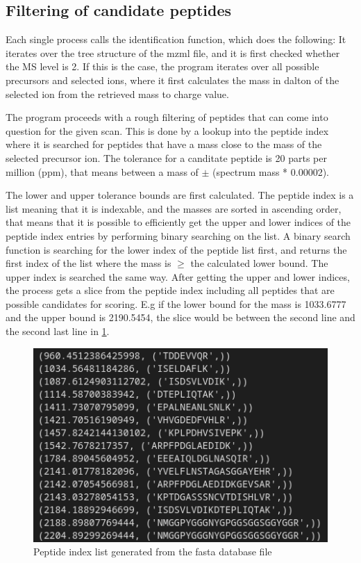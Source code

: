 \documentclass[11pt]{article}
\begin{document}
\subsection{Filtering of candidate peptides}
Each single process calls the identification function, which does the following:
It iterates over the tree structure of the mzml file, and it is first checked whether the MS level is 2. If this is the case, the program iterates over all possible precursors and selected ions, where it first calculates the mass in dalton of the selected ion from the retrieved mass to charge value. 

The program proceeds with a rough filtering of peptides that can come into question for the given scan. This is done by a lookup into the peptide index where it is searched for peptides that have a mass close to the mass of the selected precursor ion. The tolerance for a canditate peptide is 20 parts per million (ppm), that means between a mass of $\pm$ (spectrum mass * 0.00002).

The lower and upper tolerance bounds are first calculated. The peptide index is a list meaning that it is indexable, and the masses are sorted in ascending order, that means that it is possible to efficiently get the upper and lower indices of the peptide index entries by performing binary searching on the list. A binary search function is searching for the lower index of the peptide list first, and returns the first index of the list where the mass is $\ge$ the calculated lower bound. The upper index is searched the same way. After getting the upper and lower indices, the process gets a slice from the peptide index including all peptides that are possible candidates for scoring. E.g if the lower bound for the mass is 1033.6777 and the upper bound is 2190.5454, the slice would be between the second line and the second last line in \cref{fig:peptindex}.
\begin{figure}
\includegraphics[width=\linewidth]{figs/peptindex.png} 
\caption{Peptide index list generated from the fasta database file}
\label{fig:peptindex}
\end{figure}
\end{document}
